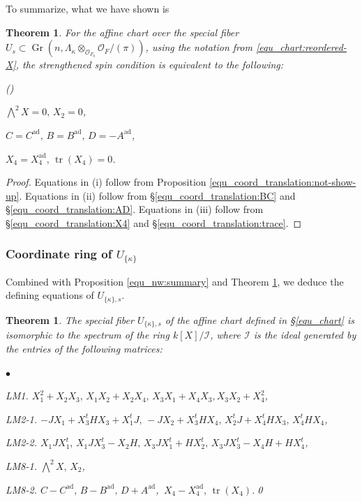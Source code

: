 \documentclass[pdflatex,sn-mathphys-num]{sn-jnl}%
\theoremstyle{thmstyleone}%
\newtheorem{theorem}[subsubsection]{Theorem}%
\theoremstyle{thmstyletwo}%
\numberwithin{equation}{subsection}
\theoremstyle{thmstylethree}%
\newcommand{\CI}{\ensuremath{\mathcal{I}}\xspace}
\newcommand{\CO}{\ensuremath{\mathcal{O}}\xspace}
\newcommand{\ad}{\mathrm{ad}}
\DeclareMathOperator{\Gr}{Gr}
\DeclareMathOperator{\tr}{tr}
\newenvironment{altenumerate}
	{\begin{list}
			{(\theenumi) }
			{\usecounter{enumi}
				\setlength{\labelwidth}{0pt}
				\setlength{\labelsep}{0pt}
				\setlength{\leftmargin}{0pt}
				\setlength{\itemsep}{\the\smallskipamount}
				\renewcommand{\theenumi}{\roman{enumi}}
		}}
		{\end{list}}
\newenvironment{altitemize}
	{\begin{list}
			{$\bullet$}
			{\setlength{\labelwidth}{0pt}
				\setlength{\itemindent}{5pt}
				\setlength{\labelsep}{5pt}
				\setlength{\leftmargin}{0pt}
				\setlength{\itemsep}{\the\smallskipamount}
		}}
		{\end{list}}
\begin{document}
To summarize, what we have shown is
\begin{theorem}\label{equ_coord:ss-red}
For the affine chart over the special fiber $U_s\subset \Gr(n,\Lambda_\kappa\otimes_{\CO_{F_0}}\CO_F/(\pi))$, using the notation from \eqref{equ_chart:reordered-X}, the strengthened spin condition is equivalent to the following:
\begin{altenumerate}
	\item $\bigwedge^2X=0,\, X_2=0$,
	\item $C=C^{\ad},\, B=B^{\ad},\, D=-A^{\ad}$,
	\item $X_4=X_4^{\ad},\,\tr(X_4)=0$.
\end{altenumerate}
\end{theorem}
\begin{proof}
Equations in (i) follow from Proposition \ref{equ_coord_translation:not-show-up}.
Equations in (ii) follow from \S \ref{equ_coord_translation:BC} and \S \ref{equ_coord_translation:AD}.
Equations in (iii) follow from \S \ref{equ_coord_translation:X4} and \S \ref{equ_coord_translation:trace}.
\end{proof}

		
		
\subsubsection{Coordinate ring of $U_{\{\kappa\}}$}
Combined with Proposition \ref{equ_nw:summary} and Theorem \ref{equ_coord:ss-red}, we deduce the defining equations of $U_{\{\kappa\},s}$.
\begin{theorem}\label{equ_coord:ss-main}
The special fiber $U_{\{\kappa\},s}$ of the affine chart defined in \S \ref{equ_chart} is isomorphic to the spectrum of the ring $k[X]/\CI$, where $\CI$ is the ideal generated by the entries of the following matrices:
\begin{altitemize}
	\item[\fontfamily{cmtt}\selectfont LM1.] $X_1^2+X_2X_3,\, X_1X_2+X_2X_4,\,
	X_3X_1+X_4X_3,X_3X_2+X_4^2$,
				
	\item[\fontfamily{cmtt}\selectfont LM2-1.] $-JX_1+X_3^t HX_3+X_1^t J,\, -JX_2+X_3^tHX_4,\, X_2^tJ+X_4^tHX_3,\, X_4^tHX_4$,
				
	\item[\fontfamily{cmtt}\selectfont LM2-2.] $X_1JX_1^t,\, X_1JX_3^t-X_2H,\, X_3JX_1^t+HX_2^t,\, X_3JX_3^t-X_4H+HX_4^t$,
				
	\item[\fontfamily{cmtt}\selectfont LM8-1.] $\bigwedge^2 X,\, X_2$,
				
	\item[\fontfamily{cmtt}\selectfont LM8-2.] $C-C^{\ad},\, B-B^{\ad},\, D+A^{\ad}$,\, $X_4-X_4^{\ad},\, \tr(X_4)$.\qed
\end{altitemize}
\end{theorem}
		
\end{document}
